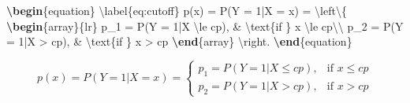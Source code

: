 \documentclass[review]{elsarticle} %
\newenvironment{Shaded}{\begin{snugshade}}{\end{snugshade}}
\newcommand{\KeywordTok}[1]{\textcolor[rgb]{0.13,0.29,0.53}{\textbf{#1}}}
\newcommand{\SpecialCharTok}[1]{\textcolor[rgb]{0.00,0.00,0.00}{#1}}
\newcommand{\SpecialStringTok}[1]{\textcolor[rgb]{0.31,0.60,0.02}{#1}}
\newcommand{\ExtensionTok}[1]{#1}
\newcommand{\NormalTok}[1]{#1}
\begin{document}
\begin{Shaded}
\begin{Highlighting}[]
\KeywordTok{\textbackslash{}begin}\NormalTok{\{}\ExtensionTok{equation}\NormalTok{\}}
\SpecialCharTok{\textbackslash{}label}\SpecialStringTok{\{eq:cutoff\}}
\SpecialStringTok{p(x) = P(Y = 1|X = x) = }
\SpecialCharTok{\textbackslash{}left\textbackslash{}\{}
\SpecialStringTok{    }\KeywordTok{\textbackslash{}begin}\NormalTok{\{}\ExtensionTok{array}\NormalTok{\}}\SpecialStringTok{\{lr\}}
\SpecialStringTok{          p_1 = P(Y = 1|X }\SpecialCharTok{\textbackslash{}le}\SpecialStringTok{ cp), & }\SpecialCharTok{\textbackslash{}text}\NormalTok{\{if \}}\SpecialStringTok{ x }\SpecialCharTok{\textbackslash{}le}\SpecialStringTok{ cp}\SpecialCharTok{\textbackslash{}\textbackslash{}}
\SpecialStringTok{          p_2 = P(Y = 1|X > cp), & }\SpecialCharTok{\textbackslash{}text}\NormalTok{\{if \}}\SpecialStringTok{ x > cp}
\SpecialStringTok{    }\KeywordTok{\textbackslash{}end}\NormalTok{\{}\SpecialStringTok{array\}}
\SpecialCharTok{\textbackslash{}right}\SpecialStringTok{.}
\KeywordTok{\textbackslash{}end}\NormalTok{\{}\ExtensionTok{equation}\NormalTok{\}}
\end{Highlighting}
\end{Shaded}

\begin{equation}
\label{eq:cutoff}
p(x) = P(Y = 1|X = x) = 
\left\{
    \begin{array}{lr}
          p_1 = P(Y = 1|X \le cp), & \text{if } x \le cp\\
          p_2 = P(Y = 1|X > cp), & \text{if } x > cp
    \end{array}
\right.
\end{equation}
\end{document}

